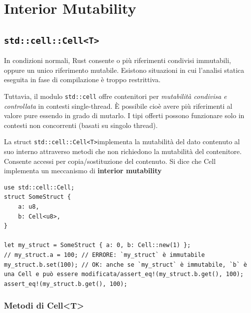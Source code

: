 \section{Interior Mutability}


\subsection{\texttt{std::cell::Cell<T>}}

In condizioni normali, Rust consente o più riferimenti condivisi
immutabili, oppure un unico riferimento mutabile. Esistono situazioni in cui
l'analisi statica eseguita in fase di compilazione è troppo restrittiva.


Tuttavia, il modulo \verb|std::cell| offre contenitori per
\textit{mutabilità condivisa e controllata} in contesti single-thread. È
possibile cioè avere più riferimenti al valore pure essendo in grado di
mutarlo. I tipi offerti possono funzionare solo in contesti non concorrenti
(basati su singolo thread).


La struct \verb|std::cell::Cell<T>|implementa la mutabilità
del dato contenuto al suo interno attraverso metodi che non richiedono la
mutabilità del contenitore. Consente accessi per copia/sostituzione del
contenuto. Si dice che Cell implementa un meccanismo di \textbf{interior mutability}



\begin{verbatim}
use std::cell::Cell;
struct SomeStruct {
    a: u8,
    b: Cell<u8>,
}

let my_struct = SomeStruct { a: 0, b: Cell::new(1) };
// my_struct.a = 100; // ERRORE: `my_struct` è immutabile
my_struct.b.set(100); // OK: anche se `my_struct` è immutabile, `b` è una Cell e può essere modificata/assert_eq!(my_struct.b.get(), 100);
assert_eq!(my_struct.b.get(), 100);
\end{verbatim}

\subsubsection{Metodi di Cell<T>}

